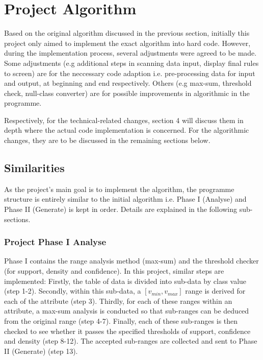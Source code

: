 \chapter{Project Algorithm}

Based on the original algorithm discussed in the previous section, initially this project only aimed to implement the exact algorithm into hard code. However, during the implementation process, several adjustments were agreed to be made. Some adjustments (e.g additional steps in scanning data input, display final rules to screen) are for the neccessary code adaption i.e. pre-processing data for input and output, at beginning and end respectively. Others (e.g max-sum, threshold check, null-class converter) are for possible improvements in algorithmic in the programme. 

Respectively, for the technical-related changes, section 4 will discuss them in depth where the actual code implementation is concerned. For the algorithmic changes, they are to be discussed in the remaining sections below.

\section{Similarities}

As the project’s main goal is to implement the algorithm, the programme structure is entirely similar to the initial algorithm i.e. Phase I (Analyse) and Phase II (Generate) is kept in order. Details are explained in the following sub-sections. \\


\subsection{Project Phase I Analyse}

Phase I contains the range analysis method (max-sum) and the threshold checker (for support, density and confidence). In this project, similar steps are implemented: Firstly, the table of data is divided into sub-data by class value (step 1-2). Secondly, within this sub-data, a $[v_{min}, v_{max}]$ range is derived for each of the attribute (step 3). Thirdly, for each of these ranges within an attribute, a max-sum analysis is conducted so that sub-ranges can be deduced from the original range (step 4-7). Finally, each of these sub-ranges is then checked to see whether it passes the specified thresholds of support, confidence and density (step 8-12). The accepted sub-ranges are collected and sent to Phase II (Generate) (step 13).

